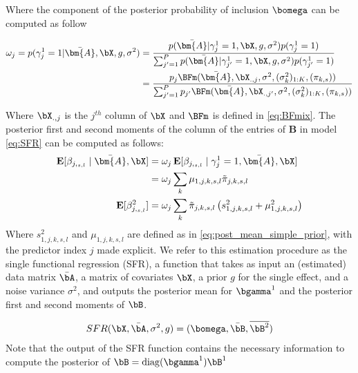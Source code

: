 Where the component of the posterior probability of inclusion $\bomega$ can be computed  as follow  

\begin{align}
  \omega_j=  p(\gamma_j^1 =1 |\bar{\bm{A}} , \bX, g, \sigma^2 )& = \frac{ p(\bar{\bm{A}} | \gamma_j^1=1, \bX, g, \sigma^2 ) p(\gamma_j^1=1)}{ \sum_{j'=1}^P p(\bar{\bm{A}} | \gamma_{j'}^1=1, \bX, g, \sigma^2 ) p(\gamma_{j'}^1=1)}\\
  &= \frac{p_j  \BFm(\bar{\bm{A}} , \bX_{.,j }, \sigma^2, (\sigma^2_k)_{1:K}, (\pi_{k,s}))}{\sum_{j'=1}^P p_{j'} \BFm(\bar{\bm{A}} , \bX_{.,j'}, \sigma^2, (\sigma^2_k)_{1:K}, (\pi_{k,s}))} \label{eq:post_alpha_mix}
\end{align}

Where $\bX_{.,j }$ is the $j^{th}$ column of $\bX$ and $\BFm$ is defined in \ref{eq:BFmix}. The posterior first and second moments of the column of the entries of $\bm{B}$ in model \ref{eq:SFR} can be computed as follows:  
\begin{align}\label{eq:ex__post}
    \mathbf{E}[\beta_{j,_{s,l}}\mid\bar{\bm{A}},\bX]& =\omega_j\,\mathbf{E}[\beta_{j,_{s,l}}\mid\gamma_j^1=1,\bar{\bm{A}},\bX]\\
   & =   \omega_j \sum_k \mu_{1,j,k,s,l} \Tilde{\pi}_{j,k,s,l} \label{eq:post_f_mix}\\
    \mathbf{E}[\beta_{j,_{s,l}}^2] & =\omega_j\sum_k\Tilde{\pi}_{j,k,s,l}\left(s^2_{1,j,k,s,l}+\mu_{1,j,k,s,l}^2\right) \label{eq:post_f2_mix}
\end{align}
Where $s^2_{1,j,k,s,l}$ and $\mu_{1,j,k,s,l}$ are defined as in \ref{eq:post_mean_simple_prior}, with the predictor index $j$ made explicit. We refer to this estimation procedure as the single functional regression (SFR), a function that takes as input an (estimated) data matrix $\Bar{\bA}$, a matrix of covariates $\bX$, a prior $g$ for the single effect, and a noise variance $\sigma^2$, and outputs the posterior mean for $\bgamma^1$ and the posterior first and second moments of $\bB$.

 \begin{align}
    SFR(\bX,\bar{\bA},\sigma^2,g)=(\bomega,\bar{\bB},\overline{\bB^2})
\end{align}
Note that the output of the SFR function contains the necessary information to compute the posterior of $\bB=\operatorname{diag}(\bgamma^1)\bB^1$

